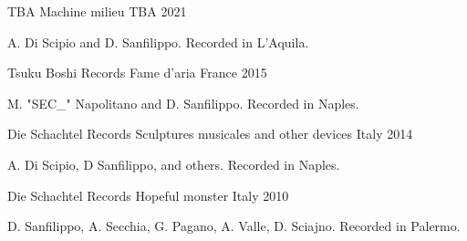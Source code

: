

\begin{cventries}

  \cventry
    {TBA} %
    {Machine milieu} %
    {TBA} %
    {2021} %
    {
      \begin{cvitems} %
        \item {A. Di Scipio and D. Sanfilippo. Recorded in L'Aquila.}
      \end{cvitems}
    }

  \cventry
    {Tsuku Boshi Records} %
    {Fame d'aria} %
    {France} %
    {2015} %
    {
      \begin{cvitems} %
        \item {M. "SEC\_" Napolitano and D. Sanfilippo. Recorded in Naples.}
      \end{cvitems}
    }

  \cventry
    {Die Schachtel Records} %
    {Sculptures musicales and other devices} %
    {Italy} %
    {2014} %
    {
      \begin{cvitems} %
        \item {A. Di Scipio, D Sanfilippo, and others. Recorded in Naples.}
      \end{cvitems}
    }

  \cventry
    {Die Schachtel Records} %
    {Hopeful monster} %
    {Italy} %
    {2010} %
    {
      \begin{cvitems} %
        \item {D. Sanfilippo, A. Secchia, G. Pagano, A. Valle, D. Sciajno. Recorded in Palermo.}
      \end{cvitems}
    }


\end{cventries}
